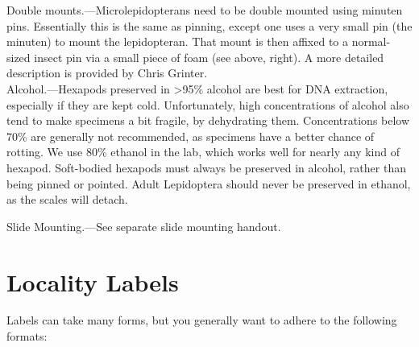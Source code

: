 \documentclass[letterpaper, 11pt]{article}
\begin{document}
Double mounts.---Microlepidopterans need to be double mounted using minuten pins. Essentially this is the same as pinning, except one uses a very small pin (the minuten) to mount the lepidopteran. That mount is then affixed to a normal-sized insect pin via a small piece of foam (see above, right). A more detailed description is provided by Chris Grinter.\\

Alcohol.---Hexapods preserved in \textgreater95\% alcohol are best for DNA extraction, especially if they are kept cold. Unfortunately, high concentrations of alcohol also tend to make specimens a bit fragile, by dehydrating them. Concentrations below 70\% are generally not recommended, as specimens have a better chance of rotting. We use 80\% ethanol in the lab, which works well for nearly any kind of hexapod. Soft-bodied hexapods must always be preserved in alcohol, rather than being pinned or pointed. Adult Lepidoptera should never be preserved in ethanol, as the scales will detach.

Slide Mounting.---See separate slide mounting handout.

\section{Locality Labels}

Labels can take many forms, but you generally want to adhere to the following formats:
\end{document}
